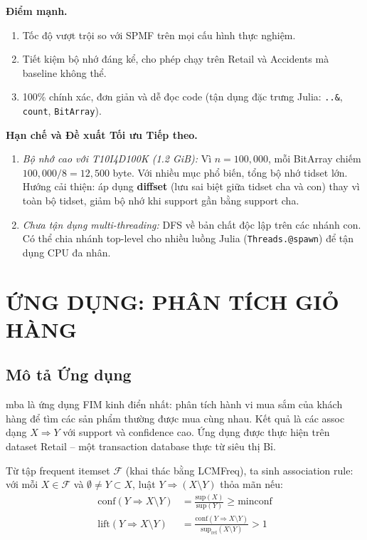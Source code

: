 \documentclass[12pt,a4paper]{article}
\newcommand{\supp}{\mathrm{sup}}
\newcommand{\conf}{\mathrm{conf}}
\theoremstyle{definition}
\begin{document}
\textbf{Điểm mạnh.}
\begin{enumerate}
    \item Tốc độ vượt trội so với SPMF trên mọi cấu hình thực nghiệm.
    \item Tiết kiệm bộ nhớ đáng kể, cho phép chạy trên Retail và Accidents mà baseline không thể.
    \item 100\% chính xác, đơn giản và dễ đọc code (tận dụng đặc trưng Julia: \texttt{..\&}, \texttt{count}, \texttt{BitArray}).
\end{enumerate}

\textbf{Hạn chế và Đề xuất Tối ưu Tiếp theo.}
\begin{enumerate}
    \item \textit{Bộ nhớ cao với T10I4D100K (1.2 GiB):} Vì $n = 100{,}000$, mỗi BitArray chiếm $100{,}000/8 = 12{,}500$ byte. Với nhiều mục phổ biến, tổng bộ nhớ tidset lớn. Hướng cải thiện: áp dụng \textbf{diffset} (lưu sai biệt giữa tidset cha và con) thay vì toàn bộ tidset, giảm bộ nhớ khi support gần bằng support cha.
    \item \textit{Chưa tận dụng multi-threading:} DFS về bản chất độc lập trên các nhánh con. Có thể chia nhánh top-level cho nhiều luồng Julia (\texttt{Threads.@spawn}) để tận dụng CPU đa nhân.
\end{enumerate}


\section{ỨNG DỤNG: PHÂN TÍCH GIỎ HÀNG}

\subsection{Mô tả Ứng dụng}

\gls{mba} là ứng dụng FIM kinh điển nhất: phân tích hành vi mua sắm của khách hàng để tìm các sản phẩm thường được mua cùng nhau. Kết quả là các \gls{assoc} dạng $X \Rightarrow Y$ với support và \gls{confidence} cao. Ứng dụng được thực hiện trên dataset Retail -- một transaction database thực từ siêu thị Bỉ.

Từ tập frequent itemset $\mathcal{F}$ (khai thác bằng LCMFreq), ta sinh association rule: với mỗi $X \in \mathcal{F}$ và $\emptyset \neq Y \subset X$, luật $Y \Rightarrow (X \setminus Y)$ thỏa mãn nếu:
\begin{align}
    \conf(Y \Rightarrow X \setminus Y) &= \frac{\supp(X)}{\supp(Y)} \geq \text{minconf} \\
    \mathrm{lift}(Y \Rightarrow X \setminus Y) &= \frac{\conf(Y \Rightarrow X \setminus Y)}{\supp_{\mathrm{rel}}(X \setminus Y)} > 1
\end{align}
\end{document}
